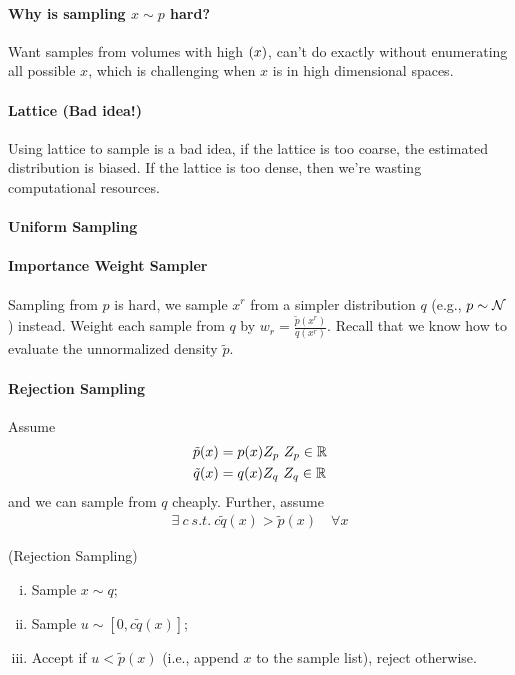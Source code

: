 \documentclass{article}
\begin{document}
	\paragraph{Why is sampling $x \sim p$ hard?} Want samples from volumes with high $\title{p}(x)$, can't do exactly without enumerating all possible $x$, which is challenging when $x$ is in high dimensional spaces.
	\paragraph{Lattice (Bad idea!)} Using lattice to sample is a bad idea, if the lattice is too coarse, the estimated distribution is biased. If the lattice is too dense, then we're wasting computational resources. 
	\paragraph{Uniform Sampling}
	
	\paragraph{Importance Weight Sampler} Sampling from $p$ is hard, we sample $x^r$ from a simpler distribution $q$ (e.g., $p \sim \mathcal{{N}}$) instead. Weight each sample from $q$ by $w_r = \frac{\tilde{p}(x^r)}{q(x^r)}$. Recall that we know how to evaluate the unnormalized density $\tilde{p}$.
	
	\paragraph{Rejection Sampling} Assume
	\begin{align}
		\tilde{p}(x) &= p(x) Z_p\ Z_p \in \mathbb{R} \\
		\tilde{q}(x) &= q(x) Z_q\ Z_q \in \mathbb{R}
	\end{align}
	and we can sample from $q$ cheaply. Further, assume
	\begin{align}
		\exists\ c\ s.t.\ c \tilde{q}(x) > \tilde{p}(x)\quad \forall x
	\end{align}
	\begin{algorithm} (Rejection Sampling)
		\begin{enumerate}[(i)]
			\item Sample $x \sim q$;
			\item Sample $u \sim [0, c \tilde{q}(x)]$;
			\item Accept if $u < \tilde{p}(x)$ (i.e., append $x$ to the sample list), reject otherwise.
		\end{enumerate}
	\end{algorithm}
	
\end{document}
